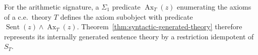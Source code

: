 For the arithmetic signature, a $\Sigma_1$ predicate
$\operatorname{Ax}_T(z)$ enumerating the axioms of a c.e.\ theory
$T$ defines the axiom subobject with predicate
$\operatorname{Sent}(z)\land\operatorname{Ax}_T(z)$.
Theorem~\ref{thm:syntactic-generated-theory} therefore represents
its internally generated sentence theory by a restriction
idempotent of $S_T$.
